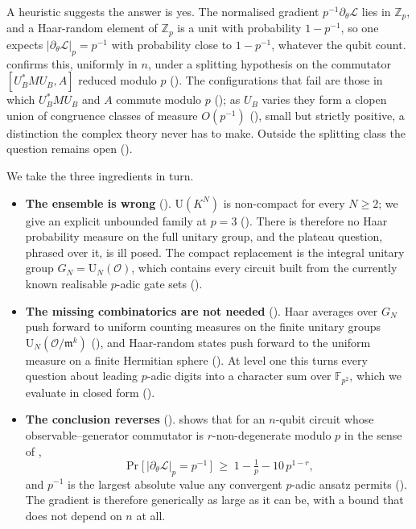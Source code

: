 \documentclass{ceurart}
\theoremstyle{plain}
\theoremstyle{definition}
\theoremstyle{remark}
\theoremstyle{plain}
\newcommand{\Zp}{\mathbb{Z}_p}
\newcommand{\padicnorm}[1]{\left|#1\right|_p}
\newcommand{\OK}{\mathcal{O}}
\newcommand{\mm}{\mathfrak{m}}
\newcommand{\loss}{\mathcal{L}}
\newcommand{\Uni}{\mathrm{U}}
\newcommand{\FF}{\mathbb{F}}
\begin{document}
A heuristic suggests the answer is yes. The normalised gradient
$p^{-1}\partial_\theta\loss$ lies in $\Zp$, and a Haar-random element of $\Zp$
is a unit with probability $1-p^{-1}$, so one expects
$\padicnorm{\partial_\theta\loss}=p^{-1}$ with probability close to $1-p^{-1}$,
whatever the qubit count.  confirms this, uniformly in $n$,
under a splitting hypothesis on the commutator $[U_B^\ast MU_B,A]$ reduced
modulo $p$ (). The configurations that fail are
those in which $U_B^\ast MU_B$ and $A$ commute modulo $p$ (); as
$U_B$ varies they form a clopen union of congruence classes of measure
$O(p^{-1})$ (), small but strictly positive, a
distinction the complex theory never has to make. Outside the splitting class
the question remains open ().

We take the three ingredients in turn.

\begin{itemize}
\item \textbf{The ensemble is wrong} (). $\Uni(K^{N})$ is
  non-compact for every $N\ge2$; we give an explicit unbounded family at $p=3$
  (). There is therefore no Haar probability
  measure on the full unitary group, and the plateau question, phrased over it,
  is ill posed. The compact replacement is the integral unitary group
  $G_N=\Uni_N(\OK)$, which contains every circuit built from the currently
  known realisable $p$-adic gate sets ().
\item \textbf{The missing combinatorics are not needed}
  (). Haar averages over $G_N$ push forward to uniform
  counting measures on the finite unitary groups $\Uni_N(\OK/\mm^{k})$
  (), and Haar-random states push forward to the uniform
  measure on a finite Hermitian sphere (). At level one
  this turns every question about leading $p$-adic digits into a character sum
  over $\FF_{p^2}$, which we evaluate in closed form ().
\item \textbf{The conclusion reverses} ().
   shows that for an $n$-qubit circuit whose
  observable--generator commutator is $r$-non-degenerate modulo $p$ in the sense
  of ,
  \[
    \Pr\bigl[\,\padicnorm{\partial_\theta\loss}=p^{-1}\,\bigr]\;\ge\;
    1-\tfrac1p-10\,p^{1-r},
  \]
  and $p^{-1}$ is the largest absolute value any convergent $p$-adic ansatz
  permits (). The gradient is therefore generically as large as
  it can be, with a bound that does not depend on $n$ at all.
\end{itemize}
\end{document}
